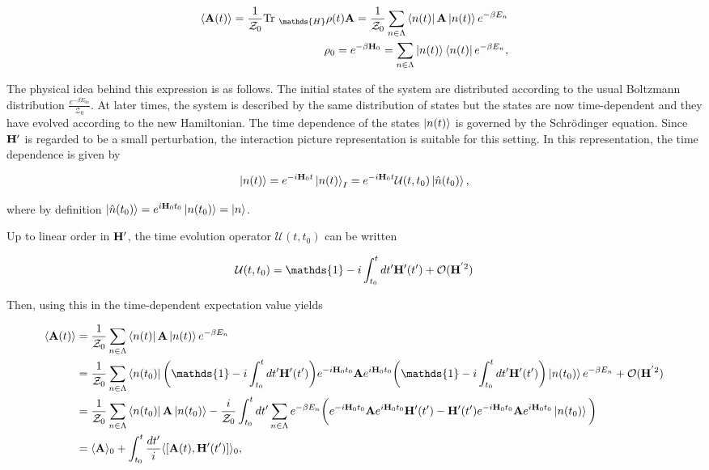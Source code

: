 \documentclass{homework}
\begin{document}
\begin{align}
        \langle {\bf A}(t) \rangle = \frac{1}{\mathcal{Z}_0} \textnormal{Tr }_{\mathds{H}} \rho(t) {\bf A}  = \frac{1}{\mathcal{Z}_0} \sum_{n \in \Lambda} \bra{n(t)} {{\bf A}} \ket{n(t)} e^{-\beta E_n} \\
        \rho_0 = e^{-\beta {\bf H}_0} = \sum_{n \in \Lambda} \ket{n(t)} \bra{n(t)} e^{-\beta E_n},
\end{align}

The physical idea behind this expression is as follows. The initial states of the system are distributed according to the usual Boltzmann distribution $\frac{e^{-\beta E_{0n}}}{\mathcal{Z_0}}$. At later times, the system is described by the same distribution of states but the states are now time-dependent and they have evolved according to the new Hamiltonian. The time dependence of the states $\ket{n(t)}$ is governed by the Schr\"odinger equation. Since ${\bf H}'$ is regarded to be a small perturbation, the interaction picture representation is suitable for this setting. In this representation, the time dependence is given by 

\begin{equation}
    \ket{n(t)} = e^{-i{\bf H}_0 t} \ket{n(t)}_I = e^{-i{\bf H}_0 t} \mathcal{U}(t, t_0) \ket{\hat{n}(t_0)},
\end{equation}

where by definition $\ket{\hat{n}(t_0)} = e^{i {\bf H}_0 t_0} \ket{n(t_0)} = \ket{n}$.

Up to linear order in ${\bf H}'$, the time evolution operator $\mathcal{U}(t, t_0)$ can be written 

$$
    \mathcal{U}(t, t_0) = \mathds{1} - i \int_{t_0}^t dt' \Hamiltonian'(t') + \mathcal{O}(\Hamiltonian^{'2})
$$

Then, using this in the time-dependent expectation value yields 

\begin{equation} \begin{split}
    \langle {\bf A}(t) \rangle &= \frac{1}{\mathcal{Z}_0} \sum_{n \in \Lambda} \bra{n(t)} {{\bf A}} \ket{n(t)} e^{-\beta E_n} \\
    &= \frac{1}{\mathcal{Z}_0} \sum_{n \in \Lambda} \bra{n(t_0)} \bigg(\mathds{1} - i \int_{t_0}^t dt' \Hamiltonian'(t')\bigg) e^{-i \Hamiltonian_0 t_0} {{\bf A}} e^{i \Hamiltonian_0 t_0} \bigg(\mathds{1} - i \int_{t_0}^t dt' \Hamiltonian'(t')\bigg) \ket{n(t_0)}  e^{-\beta E_n}+ \mathcal{O}(\Hamiltonian^{'2}) \\
    &= \frac{1}{\mathcal{Z}_0} \sum_{n \in \Lambda} \bra{n(t_0)} {{\bf A}} \ket{n(t_0)} - \frac{i}{\mathcal{Z}_0} \int_{t_0}^{t} dt' \sum_{n \in \Lambda} e^{-\beta E_n} \bigg( e^{-i \Hamiltonian_0 t_0} {{\bf A}} e^{i \Hamiltonian_0 t_0} \Hamiltonian'(t') - \Hamiltonian'(t')e^{-i \Hamiltonian_0 t_0} {{\bf A}} e^{i \Hamiltonian_0 t_0} \ket{n(t_0)} \bigg) \\
    &= \langle {{\bf A}} \rangle_{0} + \int_{t_0}^{t} \frac{dt'}{i} \langle[{{\bf A}}(t), \Hamiltonian'(t')]\rangle_{0},
\end{split}
\end{equation}
\end{document}
